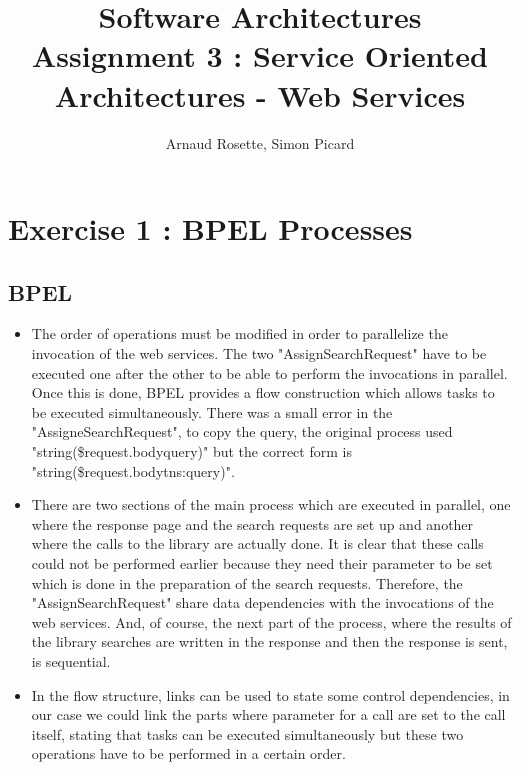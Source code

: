 \documentclass[a4paper,10pt]{article}
\title{Software Architectures\\ Assignment 3 : Service Oriented Architectures - Web Services}
\author{Arnaud Rosette, Simon Picard}
\begin{document}
\maketitle
\section{Exercise 1 : BPEL Processes}
\subsection{BPEL}
\begin{itemize}
\item The order of operations must be modified in order to parallelize the invocation of the web services. The two "AssignSearchRequest" have to be executed one  after the other to be able to perform the invocations in parallel. Once this is done, BPEL provides a flow construction which allows tasks to be executed simultaneously. There was a small error in the "AssigneSearchRequest", to copy the query, the original process used "string(\$request.body\/\/query)" but the correct form is "string(\$request.body\/\/tns:query)".\\

\item There are two sections of the main process which are executed in parallel, one where the response page and the search requests are set up and another where the calls to the library are actually done. It is clear that these calls could not be performed earlier because they need their parameter to be set which is done in the preparation of the search requests. Therefore, the "AssignSearchRequest" share data dependencies with the invocations of the web services. And, of course, the next part of the process, where the results of the library searches are written in the response and then the response is sent, is sequential.\\

\item In the flow structure, links can be used to state some control dependencies, in our case we could link the parts where parameter for a call are set to the call itself, stating that tasks can be executed simultaneously but these two operations have to be performed in a certain order.
\end{itemize}
\end{document}
